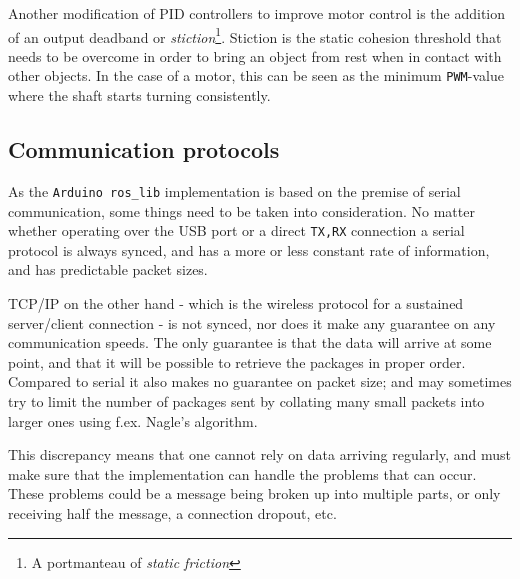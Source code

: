 \documentclass[11pt]{article}
\begin{document}
Another modification of PID controllers to improve motor control is the addition
of an output deadband or \emph{stiction}\footnote{A portmanteau of \emph{static
    friction}}. Stiction is the static cohesion threshold that needs to be
overcome in order to bring an object from rest when in contact with other
objects. In the case of a motor, this can be seen as the minimum
\texttt{PWM}-value where the shaft starts turning consistently.


\subsection{Communication protocols}
\label{sec:protocol}
As the \texttt{Arduino ros\_lib} implementation is based on the premise of
serial communication, some things need to be taken into consideration. No matter
whether operating over the USB port or a direct \texttt{TX,RX} connection a
serial protocol is always synced, and has a more or less constant rate of
information, and has predictable packet sizes. \par

TCP/IP on the other hand - which is the wireless protocol for a sustained
server/client connection - is not synced, nor does it make any guarantee on any
communication speeds. The only guarantee is that the data will arrive at some
point, and that it will be possible to retrieve the packages in proper
order. Compared to serial it also makes no guarantee on packet size; and may
sometimes try to limit the number of packages sent by collating many small
packets into larger ones using f.ex. Nagle's algorithm. \par

This discrepancy means that one cannot rely on data arriving regularly, and must
make sure that the implementation can handle the problems that can occur. These
problems could be a message being broken up into multiple parts, or only
receiving half the message, a connection dropout, etc.
\end{document}
